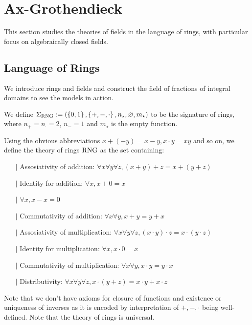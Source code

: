 \section{Ax-Grothendieck}
This section studies the theories of fields in the language of rings,
with particular focus on algebraically closed fields.
\subsection{Language of Rings}
We introduce rings and fields and construct the field of fractions
of integral domains to see the models in action.

\begin{dfn}
    We define 
    $\Sigma_{\mathrm{RNG}} := (\left\{0,1\right\},\left\{+,-,\cdot\right\},n_\star,\varnothing,m_\star)$ 
    to be the signature of rings, 
    where
    $n_+ = n_\cdot = 2$, $n_- = 1$ and $m_\star$ is the empty function.

    Using the obvious abbreviations
    $x + (-y) = x - y, x \cdot y = xy$ and so on,
    we define the theory of rings $\mathrm{RNG}$ as the set containing:
    \begin{itemize}
        \item[$\vert$] Assosiativity of addition: 
            $\forall x \forall y \forall z, (x + y) + z = x + (y + z)$
        \item[$\vert$] Identity for addition:
            $\forall x, x + 0 = x$ 
        \item[$\vert$] $\forall x, x - x = 0$ 
        \item[$\vert$] Commutativity of addition: 
            $\forall x \forall y, x + y = y + x$
        \item[$\vert$] Assosiativity of multiplication: 
        $\forall x \forall y \forall z, 
        (x \cdot y) \cdot z = x \cdot (y \cdot z)$
        \item[$\vert$] Identity for multiplication:
        $\forall x, x \cdot 0 = x$ 
        \item[$\vert$] Commutativity of multiplication: 
        $\forall x \forall y, x \cdot y = y \cdot x$
        \item[$\vert$] Distributivity:
        $\forall x \forall y \forall z, x \cdot (y + z) = x\cdot y + x \cdot z$
    \end{itemize}
    Note that we don't have axioms for closure of functions 
    and existence or uniqueness of inverses as
    it is encoded by interpretation of 
    $+, -, \cdot$ being well-defined.
    Note that the theory of rings is universal.
\end{dfn}

